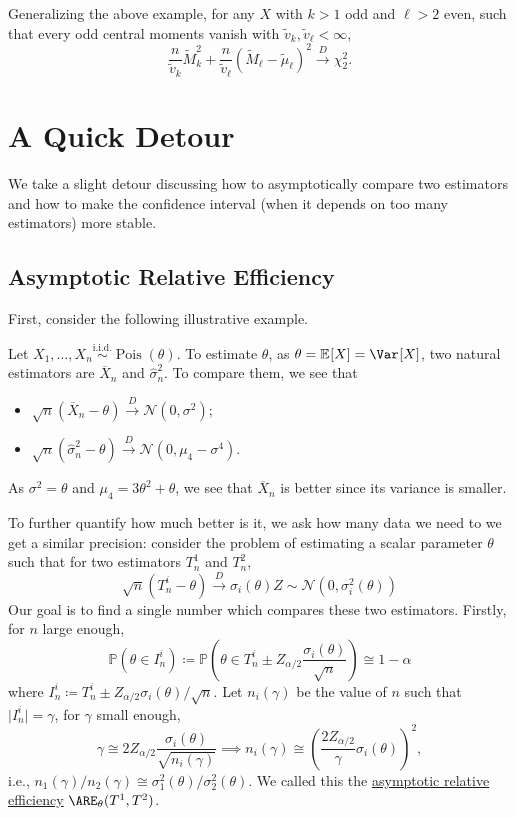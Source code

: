 Generalizing the above example, for any \(X\) with \(k > 1\) odd and \(\ell > 2\) even, such that every odd central moments vanish with \(\widetilde{v} _k , \widetilde{v} _\ell < \infty \),
\[
	\frac{n}{\widetilde{v} _k} \widetilde{M} _k^2 + \frac{n}{\widetilde{v} _\ell }(\widetilde{M} _\ell - \widetilde{\mu} _\ell )^2 \overset{D}{\to} \chi _2^2 .
\]

\section{A Quick Detour}
We take a slight detour discussing how to asymptotically compare two estimators and how to make the confidence interval (when it depends on too many estimators) more stable.

\subsection{Asymptotic Relative Efficiency}
First, consider the following illustrative example.

\begin{eg}\label{eg:ARE}
	Let \(X_1, \dots , X_n \overset{\text{i.i.d.} }{\sim } \operatorname{Pois}(\theta ) \). To estimate \(\theta \), as \(\theta = \mathbb{E}_{}[X] = \Var_{}[X] \), two natural estimators are \(\overline{X} _n\) and \(\hat{\sigma} _n^2\). To compare them, we see that
	\begin{itemize}
		\item \(\sqrt{n} (\overline{X} _n - \theta ) \overset{D}{\to} \mathcal{N} (0, \sigma ^2)\);
		\item \(\sqrt{n} (\hat{\sigma} _n^2 - \theta ) \overset{D}{\to} \mathcal{N} (0, \mu _4 - \sigma ^4)\).
	\end{itemize}
	As \(\sigma ^2 = \theta \) and \(\mu _4 = 3 \theta ^2 + \theta \), we see that \(\overline{X} _n\) is better since its variance is smaller.
\end{eg}

To further quantify how much better is it, we ask how many data we need to we get a similar precision: consider the problem of estimating a scalar parameter \(\theta \) such that for two estimators \(T_n^1\) and \(T_n^2\),
\[
	\sqrt{n} (T_n^i - \theta )
	\overset{D}{\to} \sigma _i (\theta ) Z \sim \mathcal{N} (0, \sigma _i^2(\theta ))
\]
Our goal is to find a single number which compares these two estimators. Firstly, for \(n\) large enough,
\[
	\mathbb{P} (\theta \in I_n^{i})
	\coloneqq \mathbb{P} \left( \theta \in T_n^i \pm Z_{\alpha / 2} \frac{\sigma _i(\theta )}{\sqrt{n} } \right)
	\cong 1 - \alpha
\]
where \(I_n^{i} \coloneqq T_n^i \pm Z_{\alpha / 2} \sigma _i(\theta ) / \sqrt{n} \). Let \(n_i(\gamma )\) be the value of \(n\) such that \(\vert I_n^{i} \vert = \gamma \), for \(\gamma \) small enough,
\[
	\gamma \cong 2 Z_{\alpha / 2} \frac{\sigma _i(\theta )}{\sqrt{n_i (\gamma )} }
	\implies n_i(\gamma ) \cong \left( \frac{2 Z_{\alpha / 2}}{\gamma } \sigma _i(\theta ) \right)^2 ,
\]
i.e., \(n_1(\gamma ) / n_2(\gamma ) \cong \sigma _1^2(\theta ) / \sigma _2^2(\theta )\). We called this the \hyperref[def:asymptotic-relative-efficiency-estimator]{asymptotic relative efficiency} \(\ARE_\theta (T^1, T^2) \).

